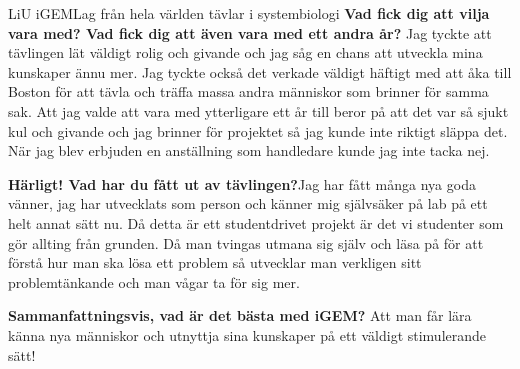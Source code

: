 \begin{news}{3}{LiU iGEM}{Lag från hela världen tävlar i systembiologi}{}{}{}
  \textbf{Vad fick dig att vilja vara med? Vad fick dig att även vara
    med ett andra år?}  Jag tyckte att tävlingen lät väldigt rolig och
  givande och jag såg en chans att utveckla mina kunskaper ännu
  mer. Jag tyckte också det verkade väldigt häftigt med att åka till
  Boston för att tävla och träffa massa andra människor som brinner
  för samma sak. Att jag valde att vara med ytterligare ett år till
  beror på att det var så sjukt kul och givande och jag brinner för
  projektet så jag kunde inte riktigt släppa det. När jag blev
  erbjuden en anställning som handledare kunde jag inte tacka nej.

  \textbf{Härligt! Vad har du fått ut av tävlingen?}Jag har fått många
  nya goda vänner, jag har utvecklats som person och känner mig
  självsäker på lab på ett helt annat sätt nu. Då detta är ett
  studentdrivet projekt är det vi studenter som gör allting från
  grunden. Då man tvingas utmana sig själv och läsa på för att förstå
  hur man ska lösa ett problem så utvecklar man verkligen sitt
  problemtänkande och man vågar ta för sig mer.

  \textbf{Sammanfattningsvis, vad är det bästa med iGEM?}  Att man får
  lära känna nya människor och utnyttja sina kunskaper på ett väldigt
  stimulerande sätt!

\end{news}


%
%
%
%
